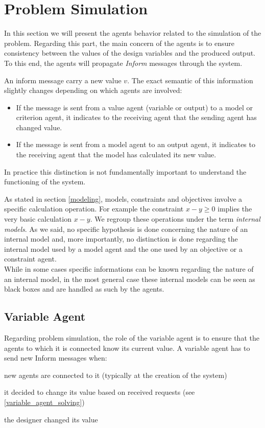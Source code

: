 \section{Problem Simulation}

In this section we will present the agents behavior related to the simulation of the problem. Regarding this part, the main concern of the agents is to ensure consistency between the values of the design variables and the produced output. To this end, the agents will propagate \emph{Inform} messages through the system.

An inform message carry a new value $v$. The exact semantic of this information slightly changes depending on which agents are involved:

\begin{itemize}
\item If the message is sent from a value agent (variable or output) to a model or criterion agent, it indicates to the receiving agent that the sending agent has changed value.

\item If the message is sent from a model agent to an output agent, it indicates to the receiving agent that the model has calculated its new value.
\end{itemize}

In practice this distinction is not fundamentally important to understand the functioning of the system.

As stated in section \ref{modeling}, models, constraints and objectives involve a specific calculation operation. For example the constraint $x -y \geq 0$ implies the very basic calculation $x - y$. We regroup these operations under the term \emph{internal models}. As we said, no specific hypothesis is done concerning the nature of an internal model and, more importantly, no distinction is done regarding the internal model used by a model agent and the one used by an objective or a constraint agent.\\
While in some cases specific informations can be known regarding the nature of an internal model, in the most general case these internal models can be seen as black boxes and are handled as such by the agents.

\subsection{Variable Agent}

Regarding problem simulation, the role of the variable agent is to ensure that the agents to which it is connected know its current value.
A variable agent has to send new Inform messages when:
\begin{compactitem}
\item new agents are connected to it (typically at the creation of the system)
\item it decided to change its value based on received requests (see \ref{variable_agent_solving})
\item the designer changed its value
\end{compactitem}

